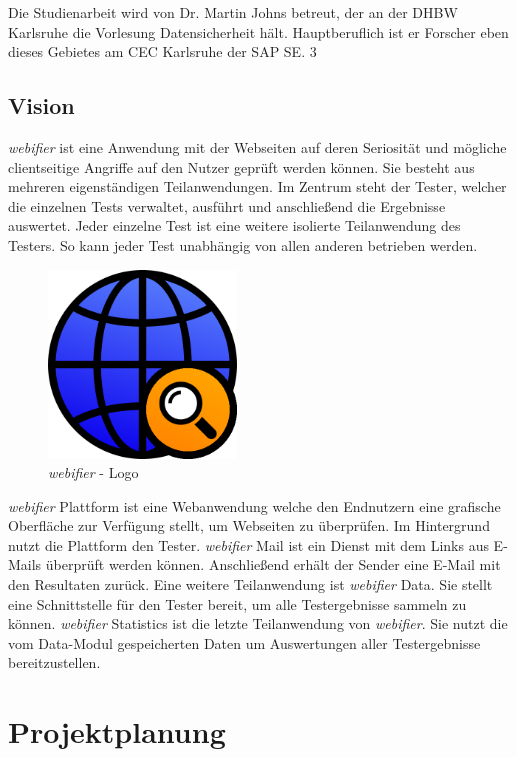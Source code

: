 \documentclass[
	pdftex,
	fontsize=12pt,          %
	DIV10,                  %
	ngerman,                %
	paper=a4,               %
	twoside=false,          %
	titlepage,              %
	parskip=half,           %
	headings=normal,        %
	listof=nochaptergap,  %
	bibliography=totoc, %
	index=totoc,            %
	captions=tableheading,  %
	final                 %
]{scrreprt}
\begin{document}
Die Studienarbeit wird von Dr. Martin Johns betreut, der an der DHBW Karlsruhe die
Vorlesung Datensicherheit hält. Hauptberuflich ist er Forscher eben dieses Gebietes am
CEC Karlsruhe der SAP SE. 3


\section{Vision}

\textit{webifier} ist eine Anwendung mit der Webseiten auf deren Seriosität und mögliche clientseitige Angriffe auf den Nutzer geprüft werden können. Sie besteht aus mehreren eigenständigen Teilanwendungen. Im Zentrum steht der Tester, welcher die einzelnen Tests verwaltet, ausführt und anschließend die Ergebnisse auswertet. Jeder einzelne Test ist eine weitere isolierte Teilanwendung des Testers. So kann jeder Test unabhängig
von allen anderen betrieben werden.

\begin{figure}[H]
	\centering
	\includegraphics[width=5cm]{bilder/webifier}
	\caption{\textit{webifier} - Logo}
	\label{fig:webifier-logo}
\end{figure}

\textit{webifier} Plattform ist eine Webanwendung welche den Endnutzern eine grafische Oberfläche zur Verfügung stellt, um Webseiten zu überprüfen. Im Hintergrund nutzt die
Plattform den Tester. \textit{webifier} Mail ist ein Dienst mit dem Links aus E-Mails überprüft werden können. Anschließend erhält der Sender eine E-Mail mit den Resultaten zurück. Eine weitere Teilanwendung ist \textit{webifier} Data. Sie stellt eine Schnittstelle für den Tester bereit, um alle Testergebnisse sammeln zu können. \textit{webifier} Statistics ist die letzte Teilanwendung von \textit{webifier}. Sie nutzt die vom Data-Modul gespeicherten Daten um Auswertungen aller Testergebnisse bereitzustellen.


\newpage
\chapter{Projektplanung}
\end{document}
